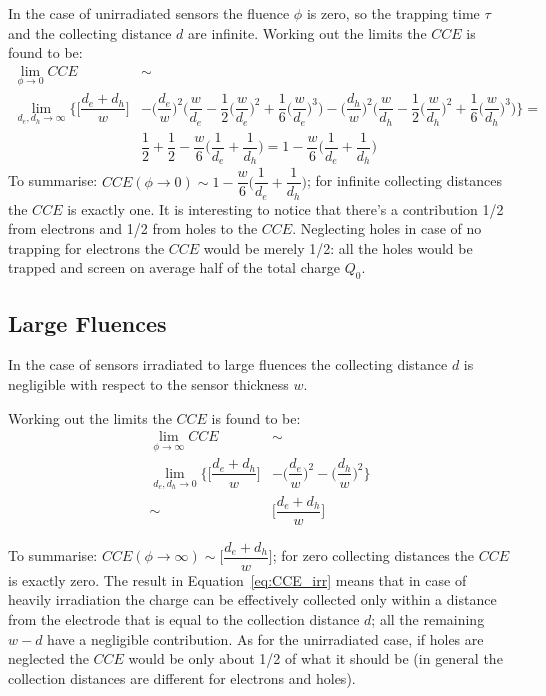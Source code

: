 In the case of unirradiated sensors the fluence $\phi$ is zero, so the trapping time $\tau$ and the 
collecting distance $d$ are infinite. Working out the limits the $CCE$ is found to be:
\begin{equation}
\begin{split}
\lim_{\phi \to 0}CCE & \sim \\ \lim_{d_e,d_h\to \infty}   \Big\{\Big[\dfrac{d_e+d_h}{w}\Big]&-\Big(\dfrac{d_e}{w}\Big)^2\Big(\dfrac{w}{d_e}-\dfrac{1}{2}\big(\dfrac{w}{d_e}\big)^2+\dfrac{1}{6}\big(\dfrac{w}{d_e}\big)^3\Big)-\Big(\dfrac{d_h}{w}\Big)^2\Big(\dfrac{w}{d_h}-\dfrac{1}{2}\big(\dfrac{w}{d_h}\big)^2+\dfrac{1}{6}\big(\dfrac{w}{d_h}\big)^3\Big)\Big\}=\\
&\dfrac{1}{2}+\dfrac{1}{2}-\dfrac{w}{6}\Big(\dfrac{1}{d_e}+\dfrac{1}{d_h}\Big)=1-\dfrac{w}{6}\Big(\dfrac{1}{d_e}+\dfrac{1}{d_h}\Big)
\end{split}
\label{eq:CCE_unirr}
\end{equation}
To summarise: $CCE(\phi\to 0)\sim1-\dfrac{w}{6}\Big(\dfrac{1}{d_e}+\dfrac{1}{d_h}\Big)$; for infinite 
collecting distances the $CCE$ is exactly one. 
It is interesting to notice that there's a contribution 1/2 from electrons and 1/2 from holes to the 
$CCE$. Neglecting holes in case of no  trapping for electrons the $CCE$  would be merely 1/2: 
all the holes would be trapped and screen on average half of the total charge $Q_0$.

\subsection{Large Fluences}
In the case of sensors irradiated to large fluences  the 
collecting distance $d$ is negligible with respect to the sensor thickness $w$.

\noindent Working out the limits the $CCE$ is found to be:
\begin{equation}
\begin{split}
\lim_{\phi \to \infty}CCE & \sim \\ 
\lim_{d_e,d_h\to 0}  \Big\{\Big[\dfrac{d_e+d_h}{w}\Big]& - \Big(\dfrac{d_e}{w}\Big)^2 -\Big(\dfrac{d_h}{w}\Big)^2\Big\}\\
\sim & \Big[\dfrac{d_e+d_h}{w}\Big]
\end{split}
\label{eq:CCE_irr}
\end{equation}

\noindent To summarise: $CCE(\phi\to \infty)\sim\Big[\dfrac{d_e+d_h}{w}\Big]$; for zero 
collecting distances the $CCE$ is exactly zero. 
The result  in Equation~\ref{eq:CCE_irr} means that in case of heavily irradiation the charge 
can be effectively collected only within a distance from the electrode that is equal to the collection distance $d$; all the remaining $w-d$ have a negligible contribution. As for the unirradiated case, if holes are neglected the $CCE$ would be only about 1/2 of what it should be (in general
 the collection distances are different for electrons and holes).


